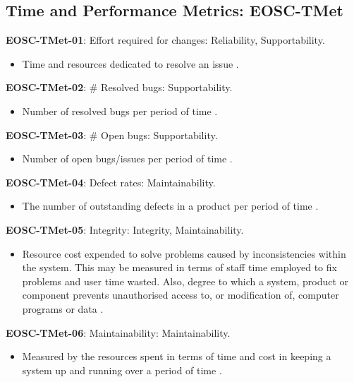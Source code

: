 \subsection{Time and Performance Metrics: EOSC-TMet}

\textbf{EOSC-TMet-01}: Effort required for changes: Reliability, Supportability.

\begin{itemize}
    \item Time and resources dedicated to resolve an issue \cite{montagud_systematic_2012}.
\end{itemize}

\textbf{EOSC-TMet-02}: \# Resolved bugs: Supportability.

\begin{itemize}
    \item Number of resolved bugs per period of time \cite{montagud_systematic_2012}.
\end{itemize}

\textbf{EOSC-TMet-03}: \# Open bugs: Supportability.

\begin{itemize}
    \item Number of open bugs/issues per period of time \cite{montagud_systematic_2012}.
\end{itemize}

\textbf{EOSC-TMet-04}: Defect rates: Maintainability.

\begin{itemize}
    \item The number of outstanding defects in a product per period of time \cite{crispin_driving_2006}.
\end{itemize}

\textbf{EOSC-TMet-05}: Integrity: Integrity, Maintainability.

\begin{itemize}
    \item Resource cost expended to solve problems caused by inconsistencies within the system. This may be measured in terms of staff time employed to fix problems and user time wasted. Also, degree to which a system, product or component prevents unauthorised access to, or modification of, computer programs or data \cite{iso_25010_2011_2017,gillies_modelling_1992}.
\end{itemize}

\textbf{EOSC-TMet-06}: Maintainability: Maintainability.

\begin{itemize}
    \item Measured by the resources spent in terms of time and cost in keeping a system up and running over a period of time \cite{gillies_modelling_1992,boehm_quantitative_1976}.
\end{itemize}

